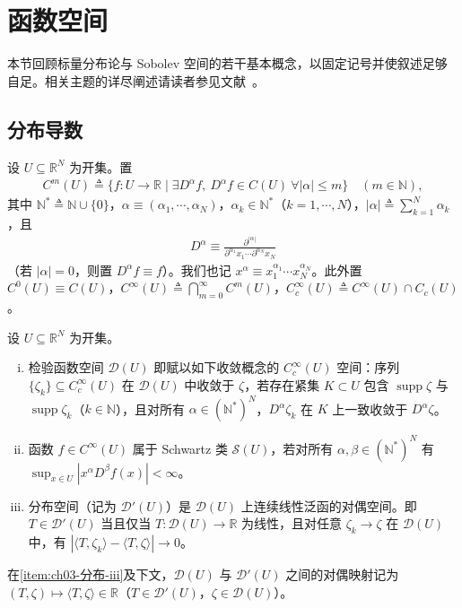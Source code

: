 \documentclass[../../main.tex]{subfiles}%
\begin{document}
\section{函数空间}\label{section:ch03-函数空间}

本节回顾标量分布论与 Sobolev 空间的若干基本概念，以固定记号并使叙述足够自足。相关主题的详尽阐述请读者参见文献~\cite{ref01,ref64}。

\subsection{分布导数}\label{subsection:ch03-分布导数}

设 $U\subseteq\mathbb{R}^N$ 为开集。置
\begin{align*}
C^m(U) \triangleq  \{f:U\to\mathbb{R}\mid \exists D^\alpha f,\ D^\alpha f\in C(U)\ \forall|\alpha|\leqslant m\}
\quad (m\in\mathbb{N}),
\end{align*}
其中 $\mathbb{N}^*\triangleq \mathbb{N}\cup\{0\}$，$\alpha\equiv(\alpha_1,\cdots ,\alpha_N)$，$\alpha_k\in\mathbb{N}^*$（$k=1,\cdots ,N$），$|\alpha|\triangleq \sum_{k=1}^N\alpha_k$，且
\begin{align*}
D^\alpha\equiv\frac{\partial^{|\alpha|}}{\partial^{\alpha_1}x_1\cdots\partial^{\alpha_N}x_N}
\end{align*}
（若 $|\alpha|=0$，则置 $D^\alpha f\equiv f$）。我们也记 $x^\alpha\equiv x_1^{\alpha_1}\cdots x_N^{\alpha_N}$。此外置 $C^0(U)\equiv C(U)$，$C^\infty(U)\triangleq \bigcap_{m=0}^\infty C^m(U)$，$C^\infty_c(U)\triangleq C^\infty(U)\cap C_c(U)$。

\begin{definition}\label{definition:ch03-分布与检验函数}
设 $U\subseteq\mathbb{R}^N$ 为开集。
\begin{enumerate}[(i)]
\item\label{item:ch03-分布-i} 检验函数空间 $\mathcal{D}(U)$ 即赋以如下收敛概念的 $C^\infty_c(U)$ 空间：序列 $\{\zeta_k\}\subseteq C^\infty_c(U)$ 在 $\mathcal{D}(U)$ 中收敛于 $\zeta$，若存在紧集 $K\subset U$ 包含 $\operatorname{supp}\zeta$ 与 $\operatorname{supp}\zeta_k$（$k\in\mathbb{N}$），且对所有 $\alpha\in(\mathbb{N}^*)^N$，$D^\alpha\zeta_k$ 在 $K$ 上一致收敛于 $D^\alpha\zeta$。
\item\label{item:ch03-分布-ii} 函数 $f\in C^\infty(U)$ 属于 Schwartz 类 $\mathcal{S}(U)$，若对所有 $\alpha,\beta\in(\mathbb{N}^*)^N$ 有 $\sup_{x\in U}|x^\alpha D^\beta f(x)|<\infty$。
\item\label{item:ch03-分布-iii} 分布空间（记为 $\mathcal{D}'(U)$）是 $\mathcal{D}(U)$ 上连续线性泛函的对偶空间。即 $T\in\mathcal{D}'(U)$ 当且仅当 $T:\mathcal{D}(U)\to\mathbb{R}$ 为线性，且对任意 $\zeta_k\to\zeta$ 在 $\mathcal{D}(U)$ 中，有 $|\langle T,\zeta_k\rangle-\langle T,\zeta\rangle|\to0$。
\end{enumerate}

在\eqref{item:ch03-分布-iii}及下文，$\mathcal{D}(U)$ 与 $\mathcal{D}'(U)$ 之间的对偶映射记为 $(T,\zeta)\mapsto\langle T,\zeta\rangle\in\mathbb{R}$（$T\in\mathcal{D}'(U)$，$\zeta\in\mathcal{D}(U)$）。
\end{definition}
\end{document}
